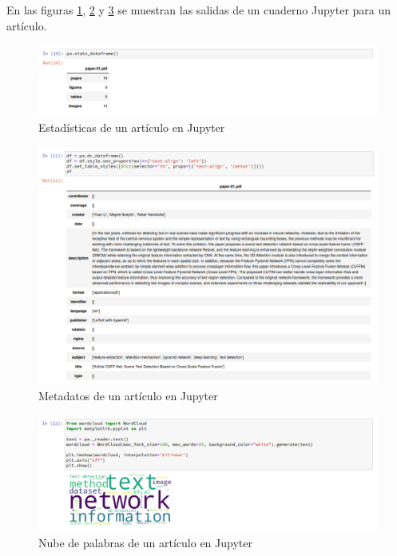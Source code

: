 \documentclass[../main.tex]{subfiles}
\begin{document}
En las figuras \ref{fig:results-paper-stats}, \ref{fig:results-paper-metadata} y \ref{fig:results-paper-wordcloud} se muestran las salidas de un cuaderno Jupyter para un artículo.

\begin{figure}[h]
	\centering
	\includegraphics[width=0.9\linewidth]{../images/results-paper-stats}
	\caption{Estadísticas de un artículo en Jupyter}
	\label{fig:results-paper-stats}
\end{figure}

\begin{figure}[h]
	\centering
	\includegraphics[width=0.9\linewidth]{../images/results-paper-metadata}
	\caption{Metadatos de un artículo en Jupyter}
	\label{fig:results-paper-metadata}
\end{figure}

\begin{figure}[h]
	\centering
	\includegraphics[width=0.9\linewidth]{../images/results-paper-wordcloud}
	\caption{Nube de palabras de un artículo en Jupyter}
	\label{fig:results-paper-wordcloud}
\end{figure}
\end{document}
